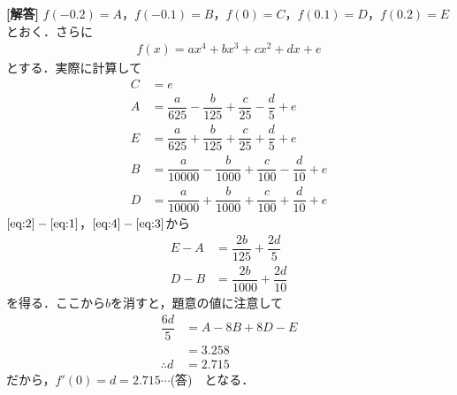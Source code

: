 \documentclass[../../main.tex]{subfiles}
\begin{document}
\begin{oframed}
  
\end{oframed}

{\bf [解答]} $f(-0.2)=A$，$f(-0.1)=B$，$f(0)=C$，$f(0.1)=D$，$f(0.2)=E$とおく．さらに
\begin{align}
  f(x)=ax^4+bx^3+cx^2+dx+e
\end{align}
とする．実際に計算して
\begin{align}
  C&=e \\
  A&=\dfrac{a}{625}-\dfrac{b}{125}+\dfrac{c}{25}-\dfrac{d}{5}+e \label{eq:1}\\
  E&=\dfrac{a}{625}+\dfrac{b}{125}+\dfrac{c}{25}+\dfrac{d}{5}+e \label{eq:2}\\
  B&=\dfrac{a}{10000}-\dfrac{b}{1000}+\dfrac{c}{100}-\dfrac{d}{10}+e\label{eq:3} \\
  D&=\dfrac{a}{10000}+\dfrac{b}{1000}+\dfrac{c}{100}+\dfrac{d}{10}+e\label{eq:4}
\end{align}
$\text{\cref{eq:2}}-\text{\cref{eq:1}}$，$\text{\cref{eq:4}}-\text{\cref{eq:3}}$から
\begin{align}
  E-A&=\dfrac{2b}{125}+\dfrac{2d}{5} \\
  D-B&=\dfrac{2b}{1000}+\dfrac{2d}{10}
\end{align}
を得る．ここから$b$を消すと，題意の値に注意して
\begin{align}
  \dfrac{6d}{5}&=A-8B+8D-E \\
  &=3.258 \\
  \therefore d&=2.715
\end{align}
だから，$f'(0)=d=2.715\cdots$(答)　となる．
\newpage
\end{document}
